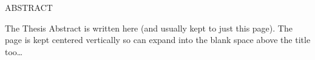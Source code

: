 %


\addchaptertocentry{\abstractname} %

\begin{center}
\MakeUppercase{Abstract}\\ \bigskip
\end{center}

The Thesis Abstract is written here (and usually kept to just this page). The page is kept centered vertically so can expand into the blank space above the title too\ldots

